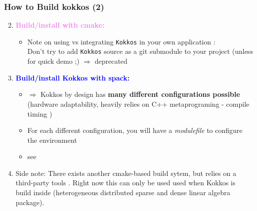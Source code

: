 \begin{frame}[fragile=singleslide]
   \frametitle{How to Build kokkos (2)}

   \begin{enumerate}
      \setcounter{enumi}{1}
   \item \textcolor{violet}{\bf Build/install with cmake:}
      \begin{itemize}
         \item Note on using vs integrating  {\tt Kokkos} in your own application :\\
         Don't try to add {\tt Kokkos} source as a git submodule to your project (unless for quick demo ;) $\Rightarrow$ deprecated

      \end{itemize}
   \item \textcolor{blue}{\textbf{Build/install Kokkos with spack:}}
      \begin{itemize}
      \item $\Rightarrow$ Kokkos by design has {\bf many different configurations possible} (hardware adaptability, heavily relies on C++ metaprograming - compile timing )
      \item For each different configuration, you will have a \textit{modulefile} to configure the environment
      \item see 
      \end{itemize}
   \item Side note: There exists another cmake-based build sytem, but relies on a third-party tools . Right now this can only be used used when Kokkos is build inside  (heterogeneous distributed sparse and dense linear algebra package).
  \end{enumerate}

\end{frame}


